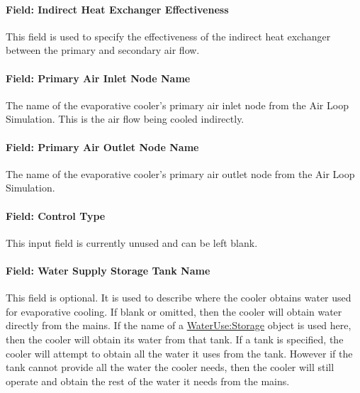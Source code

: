 \paragraph{Field: Indirect Heat Exchanger Effectiveness}\label{field-indirect-heat-exchanger-effectiveness}

This field is used to specify the effectiveness of the indirect heat exchanger between the primary and secondary air flow.

\paragraph{Field: Primary Air Inlet Node Name}\label{field-primary-air-inlet-node-name-000}

The name of the evaporative cooler's primary air inlet node from the Air Loop Simulation. This is the air flow being cooled indirectly.

\paragraph{Field: Primary Air Outlet Node Name}\label{field-primary-air-outlet-node-name-000}

The name of the evaporative cooler's primary air outlet node from the Air Loop Simulation.

\paragraph{Field: Control Type}\label{field-control-type-1}

This input field is currently unused and can be left blank.

\paragraph{Field: Water Supply Storage Tank Name}\label{field-water-supply-storage-tank-name-2}

This field is optional. It is used to describe where the cooler obtains water used for evaporative cooling. If blank or omitted, then the cooler will obtain water directly from the mains. If the name of a \hyperref[waterusestorage]{WaterUse:Storage} object is used here, then the cooler will obtain its water from that tank. If a tank is specified, the cooler will attempt to obtain all the water it uses from the tank. However if the tank cannot provide all the water the cooler needs, then the cooler will still operate and obtain the rest of the water it needs from the mains.

